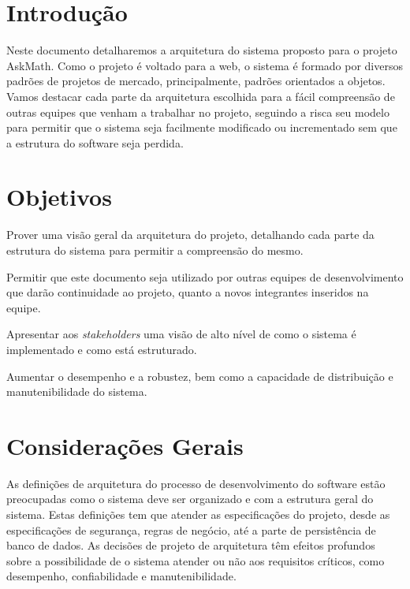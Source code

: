 \label{ap:arquitetura}

\section{Introdução}
Neste documento detalharemos a arquitetura do sistema proposto para o projeto 
AskMath. Como o projeto é voltado para a web, o sistema é formado por diversos 
padrões de projetos de mercado, principalmente, padrões orientados a objetos. 
Vamos destacar cada parte da arquitetura escolhida para a fácil compreensão de 
outras equipes que venham a trabalhar no projeto, seguindo a risca seu modelo 
para permitir que o sistema seja facilmente modificado ou incrementado sem que a 
estrutura do software seja perdida.

\section{Objetivos}
\begin{alineascomponto}
	\item Prover uma visão geral da arquitetura do projeto, detalhando cada 
parte da estrutura do sistema para permitir a compreensão do mesmo.
    \item Permitir que este documento seja utilizado por outras equipes de 
desenvolvimento que dar\~ao continuidade ao projeto, quanto a novos 
integrantes inseridos na equipe.
    \item Apresentar aos \textit{stakeholders} uma visão de alto nível de como o 
sistema é implementado e como est\'a estruturado.
    \item Aumentar o desempenho e a robustez, bem como a capacidade de 
distribuição e manutenibilidade do sistema.
\end{alineascomponto}

\section{Considerações Gerais}
As definições de arquitetura do processo de desenvolvimento do software estão 
preocupadas como o sistema deve ser organizado e com a estrutura geral do 
sistema. Estas definições tem que atender as especificações do projeto, desde as 
especificações de segurança, regras de negócio, até a parte de persistência de 
banco de dados. As decisões de projeto de arquitetura têm efeitos profundos 
sobre a possibilidade de o sistema atender ou não aos requisitos críticos, como 
desempenho, confiabilidade e manutenibilidade.

